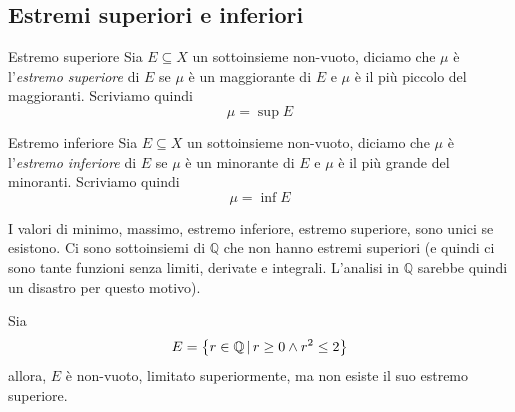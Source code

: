 \documentclass[a4paper]{article}
\begin{document}
\pagebreak

\subsection{Estremi superiori e inferiori}

\begin{radioactive}
\begin{snippetdefinition}{Estremo superiore}
    Sia \(E \subseteq X\) un sottoinsieme non-vuoto, diciamo che \(\mu\) è
    l'\textit{estremo superiore} di \(E\) se \(\mu\) è un maggiorante di \(E\) e
    \(\mu\) è il più piccolo del maggioranti.
    Scriviamo quindi
    \[
        \mu = \sup E
    \]
\end{snippetdefinition}

\begin{snippetdefinition}{Estremo inferiore}
    Sia \(E \subseteq X\) un sottoinsieme non-vuoto, diciamo che \(\mu\) è
    l'\textit{estremo inferiore} di \(E\) se \(\mu\) è un minorante di \(E\) e
    \(\mu\) è il più grande del minoranti.
    Scriviamo quindi
    \[
        \mu = \inf E
    \]
\end{snippetdefinition}

I valori di minimo, massimo, estremo inferiore, estremo superiore, sono unici se esistono.
Ci sono sottoinsiemi di \(\mathbb{Q}\) che non hanno estremi superiori (e quindi ci sono tante funzioni senza limiti, derivate e integrali.
L'analisi in \(\mathbb{Q}\) sarebbe quindi un disastro per questo motivo).

\begin{snippettheorem}{}
    Sia
    \[
        E = \left\{ r \in \mathbb{Q} \,|\, r \geq 0 \land r^2 \leq 2 \right\}
    \]
    allora, \(E\) è non-vuoto, limitato superiormente, ma non esiste il suo estremo superiore.
\end{snippettheorem}


\end{radioactive}
\end{document}
